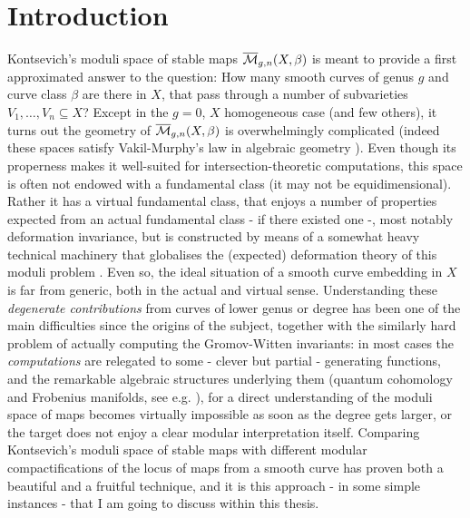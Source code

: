 

\chapter*{Introduction}
Kontsevich's moduli space of stable maps $\overline{\mathcal{M}}_{g,n}(X,\beta)$ \cite{KON} is meant to provide a first approximated answer to the question: How many smooth curves of genus $g$ and curve class $\beta$ are there in $X$, that pass through a number of subvarieties $V_1,\ldots,V_n\subseteq X$? Except in the $g=0$, $X$ homogeneous case (and few others), it turns out the geometry of $\overline{\mathcal{M}}_{g,n}(X,\beta)$ is overwhelmingly complicated (indeed these spaces satisfy Vakil-Murphy's law in algebraic geometry \cite{VakilMurphy}). Even though its properness makes it well-suited for intersection-theoretic computations, this space is often not endowed with a fundamental class (it may not be equidimensional). Rather it has a virtual fundamental class, that enjoys a number of properties expected from an actual fundamental class - if there existed one -, most notably deformation invariance, but is constructed by means of a somewhat heavy technical machinery that globalises the (expected) deformation theory of this moduli problem \cites{LiTian,BF,Behrend}. Even so, the ideal situation of a smooth curve embedding in $X$ is far from generic, both in the actual and virtual sense. Understanding these \emph{degenerate contributions} from curves of lower genus or degree has been one of the main difficulties since the origins of the subject, together with the similarly hard problem of actually computing the Gromov-Witten invariants: in most cases the \emph{computations} are relegated to some - clever but partial - generating functions, and the remarkable algebraic structures underlying them (quantum cohomology and Frobenius manifolds, see e.g. \cite{ManinFrobenius}), for a direct understanding of the moduli space of maps becomes virtually impossible as soon as the degree gets larger, or the target does not enjoy a clear modular interpretation itself. Comparing Kontsevich's moduli space of stable maps with different modular compactifications of the locus of maps from a smooth curve has proven both a beautiful and a fruitful technique, and it is this approach - in some simple instances - that I am going to discuss within this thesis.

